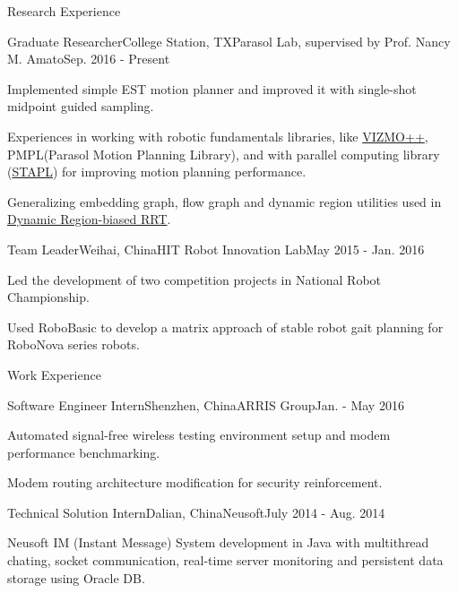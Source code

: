 \documentclass{resume} %
\begin{document}

\begin{rSection}{Research Experience}
\begin{rSubsection}{Graduate Researcher}{College Station, TX}{Parasol Lab, supervised by Prof. Nancy M. Amato}{Sep. 2016 - Present}
\item Implemented simple EST motion planner and improved it with single-shot midpoint guided sampling.
\item Experiences in working with robotic fundamentals libraries, like \href{https://parasol.tamu.edu/groups/amatogroup/research/UserGuided/Old/vizmo++/}{VIZMO++}, PMPL(Parasol Motion Planning Library), and with parallel computing library (\href{https://parasol.tamu.edu/groups/rwergergroup/research/stapl/}{STAPL}) for improving motion planning performance.
\item Generalizing embedding graph, flow graph and dynamic region utilities used in \href{http://wafr2016.berkeley.edu/papers/WAFR_2016_paper_36.pdf}{Dynamic Region-biased RRT}.
\end{rSubsection}

\begin{rSubsection}{Team Leader}{Weihai, China}{HIT Robot Innovation Lab}{May 2015 - Jan. 2016}
\item Led the development of two competition projects in National Robot Championship.
\item Used RoboBasic to develop a matrix approach of stable robot gait planning for RoboNova series robots.
\end{rSubsection}

\end{rSection}

\begin{rSection}{Work Experience}
\begin{rSubsection}{Software Engineer Intern}{Shenzhen, China}{ARRIS Group}{Jan. - May 2016}
\item Automated signal-free wireless testing environment setup and modem performance benchmarking.
\item Modem routing architecture modification for security reinforcement.
\end{rSubsection}

\begin{rSubsection}{Technical Solution Intern}{Dalian, China}{Neusoft}{July 2014 - Aug. 2014}
\item Neusoft IM (Instant Message) System development in Java with multithread chating, socket communication, real-time server monitoring and persistent data storage using Oracle DB.
\end{rSubsection}
\end{rSection}
\end{document}

